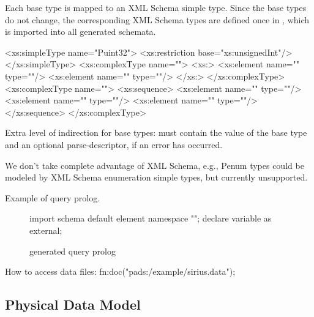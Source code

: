 Each base type is mapped to an XML Schema simple type.  Since the base
types do not change, the corresponding XML Schema types are defined
once in , which is imported into all generated schemata. 
\begin{small}
\begin{code}
<xs:simpleType name="Puint32">
  <xs:restriction base="xs:unsignedInt"/>
</xs:simpleType>
<xs:complexType name="">
  <xs:>
   <xs:element name="" type=""/>
   <xs:element name=""  type=""/>
  </xs:>
</xs:complexType>
<xs:complexType name="">
 <xs:sequence>
   <xs:element name=""  type=""/>
   <xs:element name="" type=""/>
   <xs:element name=""     type=""/>
 </xs:sequence>
</xs:complexType>
\end{code}
\end{small}



Extra level of indirection for base types: must contain the value of
the base type and an optional parse-descriptor, if an error has
occurred. 

We don't take complete advantage of XML Schema, e.g., Penum types
could be modeled by XML Schema enumeration simple types, but currently
unsupported.

Example of query prolog. 
\begin{figure*}
\begin{small}
\begin{code}
import schema default element namespace "";
declare variable  as  external; 
\end{code}
\end{small}
\caption{\padx{} generated query prolog}
\label{figure:padx-query-prolog}
\end{figure*}

How to access data files:  fn:doc("pads:/example/sirius.data");

\subsection{Physical Data Model}



